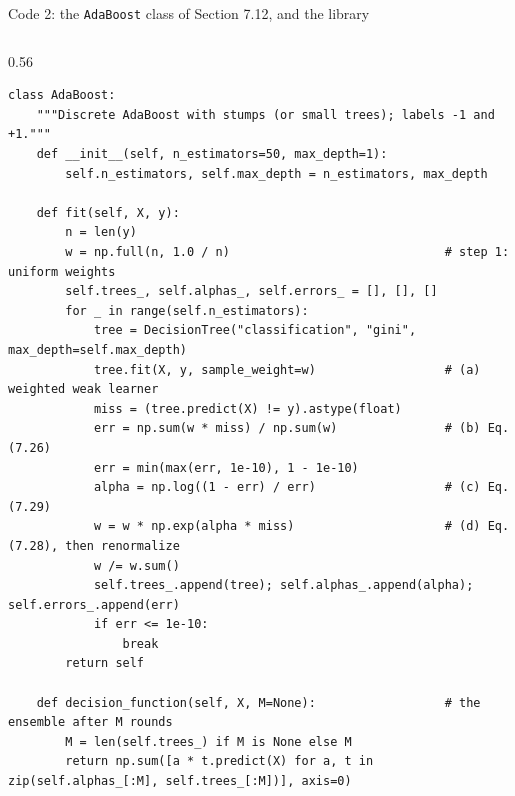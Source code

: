 \documentclass[10pt,aspectratio=169]{beamer}
\begin{document}
\begin{frame}[fragile]{Code 2: the \texttt{AdaBoost} class of Section 7.12, and the library}
\begin{columns}[T]
\begin{column}{0.56\textwidth}
\begin{lstlisting}[basicstyle=\ttfamily\tiny]
class AdaBoost:
    """Discrete AdaBoost with stumps (or small trees); labels -1 and +1."""
    def __init__(self, n_estimators=50, max_depth=1):
        self.n_estimators, self.max_depth = n_estimators, max_depth

    def fit(self, X, y):
        n = len(y)
        w = np.full(n, 1.0 / n)                              # step 1: uniform weights
        self.trees_, self.alphas_, self.errors_ = [], [], []
        for _ in range(self.n_estimators):
            tree = DecisionTree("classification", "gini", max_depth=self.max_depth)
            tree.fit(X, y, sample_weight=w)                  # (a) weighted weak learner
            miss = (tree.predict(X) != y).astype(float)
            err = np.sum(w * miss) / np.sum(w)               # (b) Eq. (7.26)
            err = min(max(err, 1e-10), 1 - 1e-10)
            alpha = np.log((1 - err) / err)                  # (c) Eq. (7.29)
            w = w * np.exp(alpha * miss)                     # (d) Eq. (7.28), then renormalize
            w /= w.sum()
            self.trees_.append(tree); self.alphas_.append(alpha); self.errors_.append(err)
            if err <= 1e-10:
                break
        return self

    def decision_function(self, X, M=None):                  # the ensemble after M rounds
        M = len(self.trees_) if M is None else M
        return np.sum([a * t.predict(X) for a, t in zip(self.alphas_[:M], self.trees_[:M])], axis=0)


\end{lstlisting}
\end{column}
\end{columns}
\end{frame}
\end{document}
